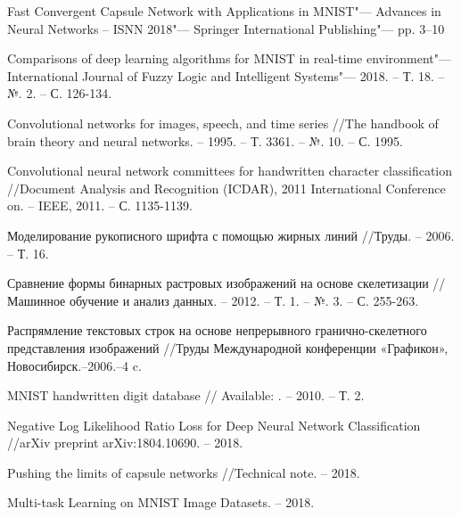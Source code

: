 \documentclass[12pt, twoside]{article}
\begin{document}
\begin{thebibliography}{1}
	Fast Convergent Capsule Network with Applications in MNIST"---
	Advances in Neural Networks -- ISNN 2018"---
	Springer International Publishing"---
	pp. 3--10

	Comparisons of deep learning algorithms for MNIST in real-time environment"---
	International Journal of Fuzzy Logic and Intelligent Systems"--- 2018. – Т. 18. – №. 2. – С. 126-134.
	
	 Convolutional networks for images, speech, and time series //The handbook of brain theory and neural networks. – 1995. – Т. 3361. – №. 10. – С. 1995.
	 
 	Convolutional neural network committees for handwritten character classification //Document Analysis and Recognition (ICDAR), 2011 International Conference on. – IEEE, 2011. – С. 1135-1139.
 
	 Моделирование рукописного шрифта с помощью жирных линий //Труды. – 2006. – Т. 16.

	 Сравнение формы бинарных растровых изображений на основе скелетизации //Машинное обучение и анализ данных. – 2012. – Т. 1. – №. 3. – С. 255-263.
	 
	 Распрямление текстовых строк на основе непрерывного гранично-скелетного представления изображений //Труды Международной конференции «Графикон», Новосибирск.–2006.–4 c.

	MNIST handwritten digit database //
	Available: 
	 . – 2010. – Т. 2.

	 Negative Log Likelihood Ratio Loss for Deep Neural Network Classification //arXiv preprint arXiv:1804.10690. – 2018.
	 
	Pushing the limits of capsule networks //Technical note. – 2018.

	 Multi-task Learning on MNIST Image Datasets. – 2018.

\end{thebibliography}
\end{document}
